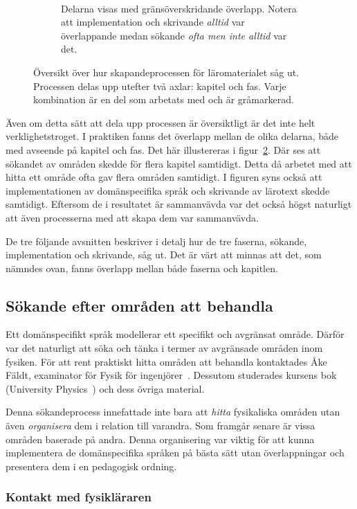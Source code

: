 \begin{figure}[tph]
\begin{subfigure}[t]{0.5\textwidth}
        \caption{Delarna visas med gränsöverskridande överlapp. Notera att
        implementation och skrivande \textit{alltid} var överlappande medan
      sökande \textit{ofta men inte alltid} var det.}~\label{fig:oversiktB}
    \end{subfigure}
    \caption{Översikt över hur skapandeprocessen för läromaterialet såg ut.
  Processen delas upp utefter två axlar: kapitel och fas. Varje kombination
  är en del som arbetats med och är gråmarkerad.}
\end{figure}

Även om detta sätt att dela upp processen är översiktligt är det inte helt
verklighetstroget. I praktiken fanns det överlapp mellan de olika delarna, både
med avseende på kapitel och fas. Det här illustereras i
figur~\ref{fig:oversiktB}. Där ses att sökandet av områden skedde för flera
kapitel samtidigt. Detta då arbetet med att hitta ett område ofta gav flera
områden samtidigt. I figuren syns också att implementationen av domänspecifika
språk och skrivande av lärotext skedde samtidigt. Eftersom de i resultatet är
sammanvävda var det också högst naturligt att även processerna med att skapa dem var sammanvävda.

De tre följande avsnitten beskriver i detalj hur de tre faserna, sökande,
implementation och skrivande, såg ut. Det är värt att minnas att det, som
nämndes ovan, fanns överlapp mellan både faserna och kapitlen.

\subsection{Sökande efter områden att behandla}\label{sec:valet}

Ett domänspecifikt språk modellerar ett specifikt och avgränsat område. Därför
var det naturligt att söka och tänka i termer av avgränsade områden inom
fysiken. För att rent praktiskt hitta områden att behandla kontaktades Åke
Fäldt, examinator för Fysik för ingenjörer~\cite{tif085}. Dessutom studerades kursens bok (University
Physics~\cite{UP}) och dess övriga material.

Denna sökandeprocess innefattade inte bara att \textit{hitta} fysikaliska
områden utan även \textit{organisera} dem i relation till varandra. Som framgår
senare är vissa områden baserade på andra. Denna organisering
var viktig för att kunna implementera de domänspecifika språken på bästa sätt utan överlappningar och presentera dem i en pedagogisk ordning.

\subsubsection*{Kontakt med fysikläraren}
\label{sec:kontakt_faldt}

